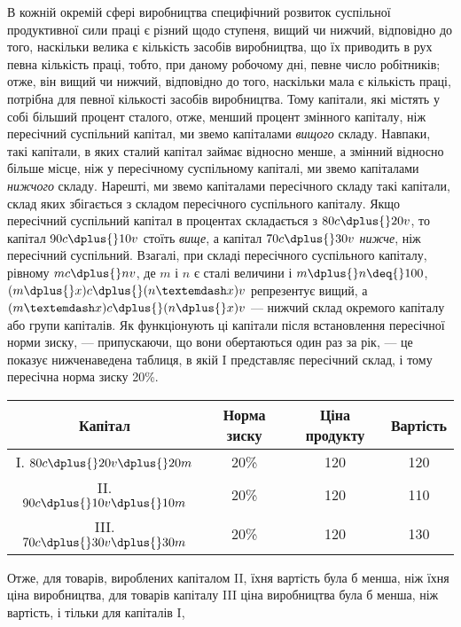 В кожній окремій сфері виробництва специфічний розвиток
суспільної продуктивної сили праці є різний щодо ступеня,
вищий чи нижчий, відповідно до того, наскільки велика є кількість засобів виробництва, що їх
приводить в рух певна кількість праці, тобто, при даному робочому дні, певне число робітників; отже,
він вищий чи нижчий, відповідно до того, наскільки
мала є кількість праці, потрібна для певної кількості засобів
виробництва. Тому капітали, які містять у собі більший процент
сталого, отже, менший процент змінного капіталу, ніж пересічний суспільний капітал, ми звемо
капіталами \emph{вищого} складу.
Навпаки, такі капітали, в яких сталий капітал займає відносно
менше, а змінний відносно більше місце, ніж у пересічному
суспільному капіталі, ми звемо капіталами \emph{нижчого} складу.
Нарешті, ми звемо капіталами пересічного складу такі капітали,
склад яких збігається з складом пересічного суспільного капіталу. Якщо пересічний суспільний капітал
в процентах складається з $80 c \dplus{} 20 v$, то капітал $90 c \dplus{} 10 v$ стоїть \emph{вище}, а капітал $70 c \dplus{} 30 v$
\emph{нижче}, ніж пересічний суспільний. Взагалі, при
складі пересічного суспільного капіталу, рівному $mc \dplus{} nv$, де
$m$ і $n$ є сталі величини і $m \dplus{} n \deq{} 100$, $(m \dplus{} x) c \dplus{} (n — x) v$ репрезентує вищий, а $(m — x) c \dplus{} (n \dplus{} x)
v$ — нижчий склад окремого капіталу або групи капіталів. Як функціонують ці капітали після
встановлення пересічної норми зиску, — припускаючи, що
вони обертаються один раз за рік, — це показує нижченаведена
таблиця, в якій I представляє пересічний склад, і тому пересічна норма зиску \deq{} 20\%.

\begin{center}
\begin{tabular}{c c c c}

\toprule
Капітал & Норма зиску & Ціна продукту & Вартість \\
\midrule

\phantom{II}I. $80 c \dplus{} 20 v \dplus{} 20 m$ & 20\% & 120 &  120 \\

\phantom{I}II.    $90 c \dplus{} 10 v \dplus{} 10 m$ & 20\% & 120 & 110\\

III. $70 c \dplus{} 30 v \dplus{} 30 m$ & 20\% & 120 & 130 \\
\end{tabular}
\end{center}
Отже, для товарів, вироблених капіталом II, їхня вартість була б
менша, ніж їхня ціна виробництва, для товарів капіталу III ціна
виробництва була б менша, ніж вартість, і тільки для капіталів I,
\parbreak{}  %
